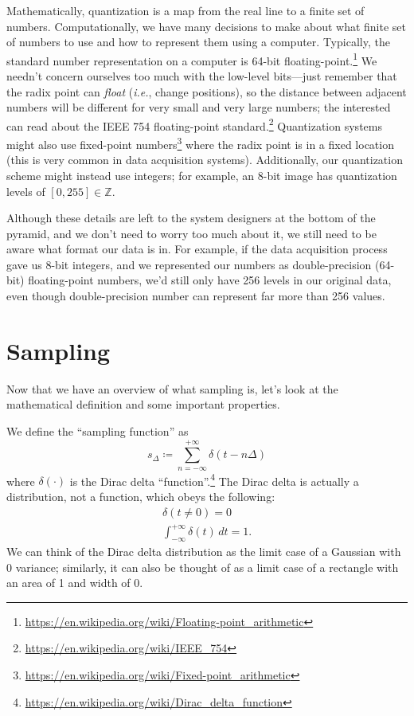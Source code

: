 \documentclass[11pt]{article}
\newcommand{\ie}{\emph{i.e.}}
\begin{document}
Mathematically, quantization is a map from the real line to a finite set of numbers. Computationally, we have many decisions to make about what finite set of numbers to use and how to represent them using a computer. Typically, the standard number representation on a computer is 64-bit floating-point.\footnote{\href{https://en.wikipedia.org/wiki/Floating-point_arithmetic}{https://en.wikipedia.org/wiki/Floating-point\_arithmetic}} We needn't concern ourselves too much with the low-level bits---just remember that the radix point can \emph{float} (\ie, change positions), so the distance between adjacent numbers will be different for very small and very large numbers; the interested can read about the IEEE 754 floating-point standard.\footnote{\href{https://en.wikipedia.org/wiki/IEEE_754}{https://en.wikipedia.org/wiki/IEEE\_754}} Quantization systems might also use fixed-point numbers\footnote{\href{https://en.wikipedia.org/wiki/Fixed-point_arithmetic}{https://en.wikipedia.org/wiki/Fixed-point\_arithmetic}} where the radix point is in a fixed location (this is very common in data acquisition systems). Additionally, our quantization scheme might instead use integers; for example, an 8-bit image has quantization levels of $[0,255] \in \mathbb{Z}$.

Although these details are left to the system designers at the bottom of the pyramid, and we don't need to worry too much about it, we still need to be aware what format our data is in. For example, if the data acquisition process gave us 8-bit integers, and we represented our numbers as double-precision (64-bit) floating-point numbers, we'd still only have 256 levels in our original data, even though double-precision number can represent far more than 256 values.

\section{Sampling}


Now that we have an overview of what sampling is, let's look at the mathematical definition and some important properties.

We define the ``sampling function'' as
\begin{equation}
    s_\Delta \coloneqq \sum_{n = - \infty}^{+\infty} \delta(t - n\Delta)
    \label{eq:sampling function}
\end{equation}
where $\delta(\cdot)$ is the Dirac delta ``function''.\footnote{\href{https://en.wikipedia.org/wiki/Dirac_delta_function}{https://en.wikipedia.org/wiki/Dirac\_delta\_function}} The Dirac delta is actually a distribution, not a function, which obeys the following:
\begin{align}
    \delta(t \neq 0) = 0 \label{eq:dirac property 0} \\
    \int_{-\infty}^{+\infty} \delta(t) \, dt = 1. \label{eq:dirac property 1}
\end{align}
We can think of the Dirac delta distribution as the limit case of a Gaussian with 0 variance; similarly, it can also be thought of as a limit case of a rectangle with an area of 1 and width of 0.
\end{document}
